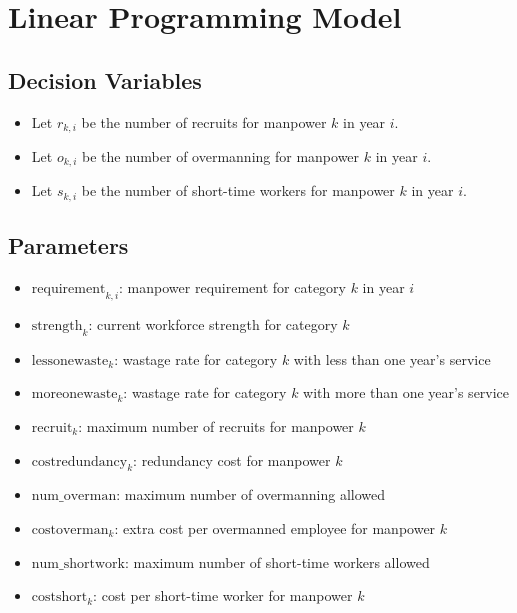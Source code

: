 \documentclass{article}
\begin{document}
\section*{Linear Programming Model}

\subsection*{Decision Variables}
\begin{itemize}
    \item Let \( r_{k,i} \) be the number of recruits for manpower \( k \) in year \( i \).
    \item Let \( o_{k,i} \) be the number of overmanning for manpower \( k \) in year \( i \).
    \item Let \( s_{k,i} \) be the number of short-time workers for manpower \( k \) in year \( i \).
\end{itemize}

\subsection*{Parameters}
\begin{itemize}
    \item \( \text{requirement}_{k,i} \): manpower requirement for category \( k \) in year \( i \)
    \item \( \text{strength}_{k} \): current workforce strength for category \( k \)
    \item \( \text{lessonewaste}_{k} \): wastage rate for category \( k \) with less than one year's service
    \item \( \text{moreonewaste}_{k} \): wastage rate for category \( k \) with more than one year's service
    \item \( \text{recruit}_{k} \): maximum number of recruits for manpower \( k \)
    \item \( \text{costredundancy}_{k} \): redundancy cost for manpower \( k \)
    \item \( \text{num\_overman} \): maximum number of overmanning allowed
    \item \( \text{costoverman}_{k} \): extra cost per overmanned employee for manpower \( k \)
    \item \( \text{num\_shortwork} \): maximum number of short-time workers allowed
    \item \( \text{costshort}_{k} \): cost per short-time worker for manpower \( k \)
\end{itemize}
\end{document}
